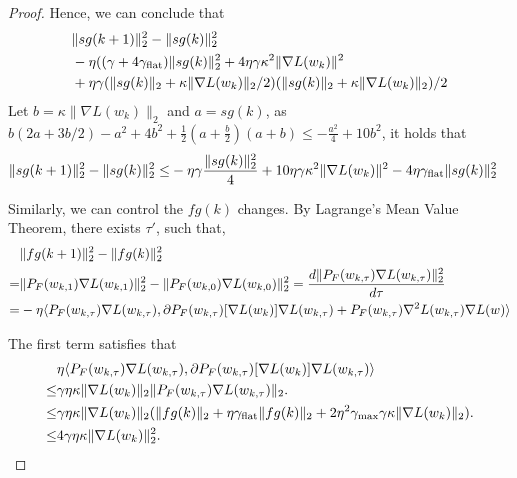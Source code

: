 \begin{proof}
    Hence, we can conclude that 
    \begin{align}
        &\|sg(k + 1)\|_2^2 - \|sg(k)\|_2^2 \notag\\
        &-\eta((\gamma  + 4 \gamma_{\mathrm{flat}}) \| sg(k)\|_2^2  + 4 \eta  \gamma \kappa^2 \| \nabla  L(w_k) \|^2 \notag \\
        &+ \eta \gamma   (\| sg(k)\|_2 
 +   \kappa \| \nabla L(w_k) \|_2 / 2)(\| sg(k)\|_2 
 +   \kappa \| \nabla L(w_k) \|_2)/ 2 \notag 
    \end{align}
    Let $b = \kappa  \| \nabla L(w_k)\|_2$ and $a = sg(k)$, as $b(2a + 3b/2) -a^2 + 4 b^2 + \frac{1}{2} (a + \frac{b}{2})(a + b) \le -\frac{a^2}{4} + 10b^2$, it holds that
    \begin{align}
    \label{eq:sg}
    \|sg(k + 1)\|_2^2 - \|sg(k)\|_2^2 \le& 
    -\eta \gamma \frac{\| sg(k)\|_2^2 }{4} + 10 \eta \gamma \kappa^2  \| \nabla  L(w_k) \|^2  - 4 \eta \gamma_{\mathrm{flat}} \| sg(k)\|_2^2 
    \end{align}

    Similarly, we can control the $fg(k) $ changes. By Lagrange's Mean Value Theorem, there exists $\tau'$, such that,
    \begin{align*}
        &\| fg(k + 1) \|_2^2 - \| fg(k)\|_2^2 \\ =& 
        \| {P}_F(w_{k,1}) \nabla L(w_{k,1})\|_2^2 - \| {P}_F(w_{k,0}) \nabla L(w_{k,0})\|_2^2 = \frac{d \| {P}_F(w_{k,\tau}) \nabla L(w_{k,\tau}) \|_2^2}{d \tau} \\
        =& -\eta \langle {P}_F(w_{k,\tau}) \nabla L(w_{k,\tau}), \partial {P}_F (w_{k, \tau})[\nabla L(w_k)] \nabla L(w_{k, \tau}) + {P}_F (w_{k, \tau}) \nabla^2 L(w_{k, \tau}) \nabla L(w)\rangle 
    \end{align*}

    The first term satisfies that 
    \begin{align*}
        &\eta \langle {P}_F(w_{k,\tau}) \nabla L(w_{k,\tau}), \partial {P}_F (w_{k, \tau})[\nabla L(w_k)] \nabla L(w_{k, \tau}) \rangle \\
        \le& \gamma \eta \kappa \| \nabla L(w_k)\|_2 \| {P}_F(w_{k,\tau}) \nabla L(w_{k,\tau}) \|_2. \\
        \le&  \gamma \eta \kappa \| \nabla L(w_k)\|_2 ( \| fg(k) \|_2 + \eta \gamma_{\mathrm{flat}} \|  fg(k) \|_2 + 2\eta^2 \gamma_{\mathrm{max}} \gamma \kappa \| \nabla L(w_k)\|_2). \\\le& 4  \gamma \eta \kappa  \| \nabla L(w_k)\|_2^2.
    \end{align*}


\end{proof}
